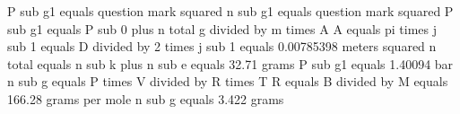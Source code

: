 P sub g1 equals question mark squared
n sub g1 equals question mark squared
P sub g1 equals P sub 0 plus n total g divided by m times A
A equals pi times j sub 1 equals D divided by 2 times j sub 1 equals 0.00785398 meters squared
n total equals n sub k plus n sub e equals 32.71 grams
P sub g1 equals 1.40094 bar
n sub g equals P times V divided by R times T
R equals B divided by M equals 166.28 grams per mole
n sub g equals 3.422 grams